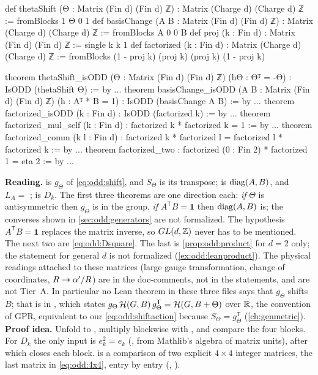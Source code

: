 \begin{leanbox}
\begin{leancode}
def thetaShift (Θ : Matrix (Fin d) (Fin d) ℤ) :
    Matrix (Charge d) (Charge d) ℤ := fromBlocks 1 Θ 0 1
def basisChange (A B : Matrix (Fin d) (Fin d) ℤ) :
    Matrix (Charge d) (Charge d) ℤ := fromBlocks A 0 0 B
def proj (k : Fin d) : Matrix (Fin d) (Fin d) ℤ := single k k 1
def factorized (k : Fin d) : Matrix (Charge d) (Charge d) ℤ :=
  fromBlocks (1 - proj k) (proj k) (proj k) (1 - proj k)

theorem thetaShift_isODD (Θ : Matrix (Fin d) (Fin d) ℤ) (hΘ : Θᵀ = -Θ) :
    IsODD (thetaShift Θ) := by ...
theorem basisChange_isODD (A B : Matrix (Fin d) (Fin d) ℤ)
    (h : Aᵀ * B = 1) : IsODD (basisChange A B) := by ...
theorem factorized_isODD (k : Fin d) : IsODD (factorized k) := by ...
theorem factorized_mul_self (k : Fin d) :
    factorized k * factorized k = 1 := by ...
theorem factorized_comm (k l : Fin d) :
    factorized k * factorized l = factorized l * factorized k := by ...
theorem factorized_two : factorized (0 : Fin 2) * factorized 1 = eta 2 := by ...
\end{leancode}
\textbf{Reading.}  is $g_\Theta$ of \eqref{eq:odd:shift}, and
$S_\Theta$ is its transpose;  is $\operatorname{diag}(A,B)$, and
$L_A=$ ;  is $D_k$. The first three theorems
are one direction each: \emph{if} $\Theta$ is antisymmetric then $g_\Theta$ is in the
group, \emph{if} $A^{\mathsf T}B=\mathbf 1$ then $\operatorname{diag}(A,B)$ is; the converses shown
in \cref{sec:odd:generators} are not formalized. The hypothesis
$A^{\mathsf T}B=\mathbf 1$ replaces the matrix inverse, so $GL(d,\mathbb{Z})$ never has to be
mentioned. The next two are \eqref{eq:odd:Dsquare}. The last is \cref{prop:odd:product}
for $d=2$ only; the statement for general $d$ is not formalized
(\cref{ex:odd:leanproduct}). The physical readings attached to these matrices (large gauge
transformation, change of coordinates, $R\to\alpha'/R$) are in the doc-comments, not in the
statements, and are not Tier~A. In particular no Lean theorem in these three files says
that $g_\Theta$ shifts $B$; that is  in ,
which states
$g_\Theta\,\mathcal{H}(G,B)\,g_\Theta^{\mathsf T}=\mathcal{H}(G,B+\Theta)$ over $\mathbb{R}$, the
convention of GPR, equivalent to our \eqref{eq:odd:shiftaction} because
$S_\Theta=g_\Theta^{\mathsf T}$ (\cref{ch:genmetric}).
\textbf{Proof idea.} Unfold to , multiply blockwise with
, and compare the four blocks. For $D_k$ the only input is
$e_k^2=e_k$ (, from Mathlib's algebra of matrix units), after which
 closes each block.  is a comparison of two explicit
$4\times4$ integer matrices, the last matrix in \eqref{eq:odd:4x4}, entry by entry
(, ). \TA
\end{leanbox}

